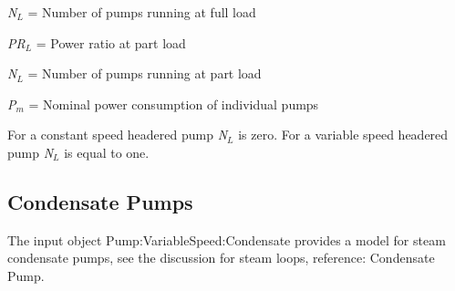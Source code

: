 \emph{N\(_{L}\)} = Number of pumps running at full load

\emph{PR\(_{L}\)} = Power ratio at part load

\emph{N\(_{L}\)} = Number of pumps running at part load

\emph{P\(_{m}\)} = Nominal power consumption of individual pumps

For a constant speed headered pump \emph{N\(_{L}\)} is zero. For a variable speed headered pump \emph{N\(_{L}\)} is equal to one.

\subsection{Condensate Pumps}\label{condensate-pumps}

The input object Pump:VariableSpeed:Condensate provides a model for steam condensate pumps, see the discussion for steam loops, reference: Condensate Pump.
